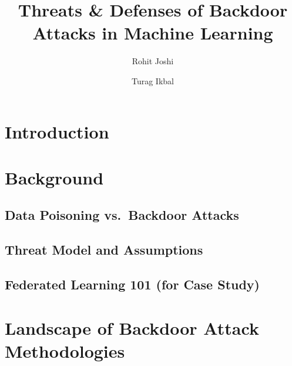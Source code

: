 \documentclass[sigconf,authorversion,nonacm,balance=false]{acmart}
\begin{document}
\title{Threats \& Defenses of Backdoor Attacks in Machine Learning}

\author{Rohit Joshi}

\author{Turag Ikbal}

\begin{abstract}
\end{abstract}


\section{Introduction}\label{sec:intro}

\section{Background}\label{sec:background}
\subsection{Data Poisoning vs.\ Backdoor Attacks}
\subsection{Threat Model and Assumptions}
\subsection{Federated Learning 101 (for Case Study)}

\section{Landscape of Backdoor Attack Methodologies}\label{sec:attacks}
\end{document}
